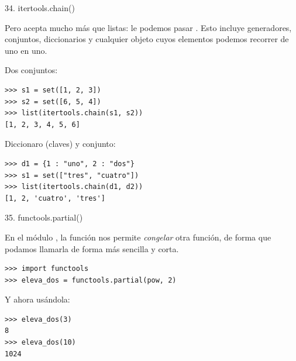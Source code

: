 \documentclass[14pt]{beamer}
\begin{document}
\begin{frame}[fragile]{34. itertools.chain()}
  \small
  \begin{alertblock}{}
    \centering
    Pero  acepta mucho más que listas: le podemos pasar
    . Esto incluye
    generadores, conjuntos, diccionarios y cualquier objeto cuyos
    elementos podemos recorrer de uno en uno.
  \end{alertblock}

  \scriptsize
  \begin{exampleblock}
    {Dos conjuntos:}
    \begin{lstlisting}
>>> s1 = set([1, 2, 3])
>>> s2 = set([6, 5, 4])
>>> list(itertools.chain(s1, s2))
[1, 2, 3, 4, 5, 6]
    \end{lstlisting}
  \end{exampleblock}

  \begin{exampleblock}
    {Diccionaro (claves) y conjunto:}
    \begin{lstlisting}
>>> d1 = {1 : "uno", 2 : "dos"}
>>> s1 = set(["tres", "cuatro"])
>>> list(itertools.chain(d1, d2))
[1, 2, 'cuatro', 'tres']
    \end{lstlisting}
  \end{exampleblock}
\end{frame}

\begin{frame}[fragile]{35. functools.partial()}
  \small
  \begin{block}{}
    \centering
    En el módulo , la función
     nos permite \emph{congelar} otra función,
     de forma que podamos llamarla de
    forma más sencilla y corta.
  \end{block}

  \begin{exampleblock}{}
    \begin{lstlisting}
>>> import functools
>>> eleva_dos = functools.partial(pow, 2)
    \end{lstlisting}
  \end{exampleblock}

\begin{exampleblock}
  {Y ahora usándola:}
    \begin{lstlisting}
>>> eleva_dos(3)
8
>>> eleva_dos(10)
1024
    \end{lstlisting}
  \end{exampleblock}
\end{frame}
\end{document}
